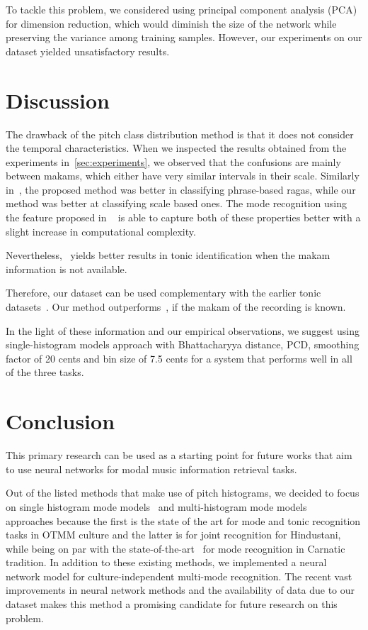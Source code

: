 \documentclass{sig-alternate}
\begin{document}
To tackle this problem, we considered using principal component analysis (PCA)~\cite{pca} for dimension reduction, which would diminish the size of the network while preserving the variance among training samples. However, our experiments on our dataset yielded unsatisfactory results. 

\section{Discussion}\label{sec:discussion}

The drawback of the pitch class distribution method is that it does not consider the temporal characteristics. When we inspected the results obtained from the experiments in~\ref{sec:experiments}, we observed that the confusions are mainly between makams, which either have very similar intervals in their scale. Similarly in~\cite{gulati_network}, the proposed method was better in classifying phrase-based ragas, while our method was better at classifying scale based ones. The mode recognition using the feature proposed in ~\cite{hindustani_carnatic_experiments_anon} is able to capture both of these properties better with a slight increase in computational complexity.

Nevertheless,~\cite{sercan_tonic} yields better results in tonic identification when the makam information is not available.

Therefore, our dataset can be used complementary with the earlier tonic datasets~\cite{senturk2013karar_ismir, atli2014makamFeature_atmm}. Our method outperforms~\cite{sercan_tonic}, if the makam of the recording is known. 

In the light of these information and our empirical observations, we suggest using single-histogram models approach with Bhattacharyya distance, PCD, smoothing factor of 20 cents and bin size of 7.5 cents for a system that performs well in all of the three tasks. 


\section{Conclusion}\label{sec:conclusion}

This primary research can be used as a starting point for future works that aim to use neural networks for modal music information retrieval tasks. 

Out of the listed methods that make use of pitch histograms, we decided to focus on single histogram mode models~\cite{bozkurt_makam,bozkurt_tonic} and multi-histogram mode models~\cite{chordia} approaches because the first is the state of the art for mode and tonic recognition tasks in OTMM culture and the latter is for joint recognition for Hindustani, while being on par with the state-of-the-art~\cite{gulati_network} for mode recognition in Carnatic tradition. In addition to these existing methods, we implemented a neural network model for culture-independent multi-mode recognition. The recent vast improvements in neural network methods and the availability of data due to our dataset makes this method a promising candidate for future research on this problem. 




\end{document}
